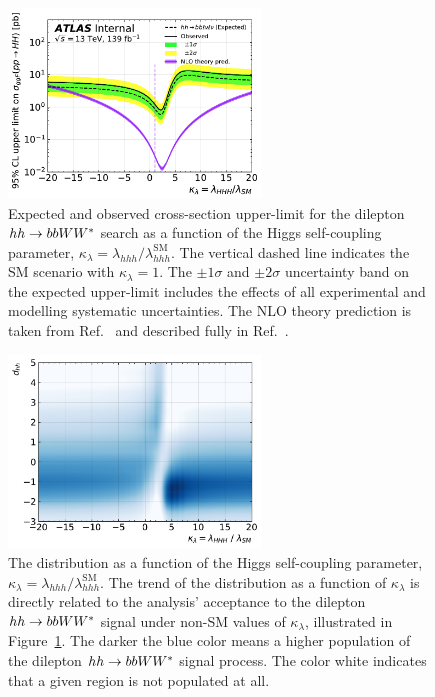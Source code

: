 \begin{figure}[!htb]
    \begin{center}
        \includegraphics[width=0.6\textwidth]{figures/search_hh/results/wwbb_lambda_scan_may7}
        \caption{
            Expected and observed cross-section upper-limit for the dilepton $hh \rightarrow bbWW^*$ search
            as a function of the Higgs self-coupling parameter, $\kappa_{\lambda} = \lambda_{hhh} / \lambda_{hhh}^{\text{SM}}$.
            The vertical dashed line indicates the SM scenario with $\kappa_{\lambda} = 1$.
            The $\pm 1\sigma$ and $\pm 2 \sigma$ uncertainty band on the expected upper-limit includes the effects
            of all experimental and modelling systematic uncertainties.
            The NLO theory prediction is taken from Ref.~\cite{deFlorian:2016spz} and described fully
            in Ref.~\cite{HHComb36}.
        }
        \label{fig:hh_lambda_scan}
    \end{center}
\end{figure}

\begin{figure}[!htb]
    \begin{center}
        \includegraphics[width=0.6\textwidth]{figures/search_hh/results/dhh_vs_lambda}
        \caption{
            The \dhh distribution as a function of the Higgs self-coupling parameter, $\kappa_{\lambda} = \lambda_{hhh} / \lambda_{hhh}^{\text{SM}}$.
            The trend of the \dhh distribution as a function of $\kappa_{\lambda}$ is directly related to the analysis'
            acceptance to the dilepton $hh \rightarrow bbWW^*$ signal under non-SM values of $\kappa_{\lambda}$,
            illustrated in Figure~\ref{fig:hh_lambda_scan}.
            The darker the blue color means a higher population of the dilepton $hh \rightarrow bbWW^*$ signal process.
            The color white indicates that a given region is not populated at all.
        }
        \label{fig:dhh_vs_lambda}
    \end{center}
\end{figure}
